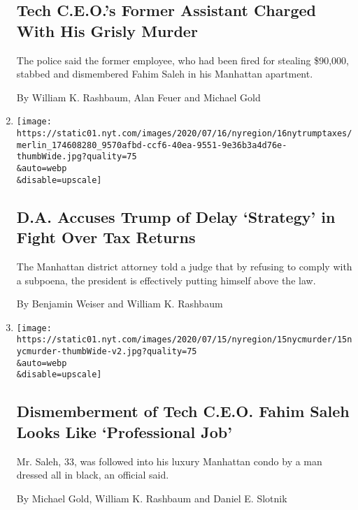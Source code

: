 \begin{enumerate}
{  \subsection{Tech C.E.O.'s Former Assistant Charged With His Grisly
  Murder}\label{tech-ceos-former-assistant-charged-with-his-grisly-murder}}

  The police said the former employee, who had been fired for stealing
  \$90,000, stabbed and dismembered Fahim Saleh in his Manhattan
  apartment.

  By William K. Rashbaum, Alan Feuer and Michael Gold
\item
  \href{/2020/07/16/nyregion/donald-trump-taxes-cyrus-vance.html}{}

  \texttt{[image: https://static01.nyt.com/images/2020/07/16/nyregion/16nytrumptaxes/merlin\_174608280\_9570afbd-ccf6-40ea-9551-9e36b3a4d76e-thumbWide.jpg?quality=75\\\&auto=webp\\\&disable=upscale]}

  \hypertarget{da-accuses-trump-of-delay-strategy-in-fight-over-tax-returns}{%
  \subsection{D.A. Accuses Trump of Delay `Strategy' in Fight Over Tax
  Returns}\label{da-accuses-trump-of-delay-strategy-in-fight-over-tax-returns}}

  The Manhattan district attorney told a judge that by refusing to
  comply with a subpoena, the president is effectively putting himself
  above the law.

  By Benjamin Weiser and William K. Rashbaum
\item
  \href{/2020/07/15/nyregion/fahim-saleh-lower-east-side-murder.html}{}

  \texttt{[image: https://static01.nyt.com/images/2020/07/15/nyregion/15nycmurder/15nycmurder-thumbWide-v2.jpg?quality=75\\\&auto=webp\\\&disable=upscale]}

  \hypertarget{dismemberment-of-tech-ceo-fahim-saleh-looks-like-professional-job}{%
  \subsection{Dismemberment of Tech C.E.O. Fahim Saleh Looks Like
  `Professional
  Job'}\label{dismemberment-of-tech-ceo-fahim-saleh-looks-like-professional-job}}

  Mr. Saleh, 33, was followed into his luxury Manhattan condo by a man
  dressed all in black, an official said.

  By Michael Gold, William K. Rashbaum and Daniel E. Slotnik
\end{enumerate}

